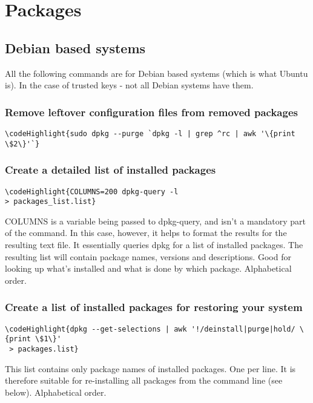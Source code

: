 \documentclass[12pt,a4paper]{article}
\begin{document}
\section{Packages}
\label{Packages}
\subsection{Debian based systems}
All the following commands are for Debian based systems (which is what Ubuntu is). In the case of trusted keys - not all Debian systems have them. 
\subsubsection{Remove leftover configuration files from removed packages}
\begin{Verbatim}[commandchars=\\\{\}]
\codeHighlight{sudo dpkg --purge `dpkg -l | grep ^rc | awk '\{print \$2\}'`}
\end{Verbatim}


\subsubsection{Create a detailed list of installed packages}
\begin{Verbatim}[commandchars=\\\{\}]
\codeHighlight{COLUMNS=200 dpkg-query -l
> packages_list.list}
\end{Verbatim}
COLUMNS is a variable being passed to dpkg-query, and isn't a mandatory part of the command.  In this case, however, it helps to format the results for the resulting text file. It essentially queries dpkg for a list of installed packages. The resulting list will contain package names, versions and descriptions. Good for looking up what’s installed and what is done by which package. Alphabetical order.

\subsubsection{Create a list of installed packages for restoring your system}
\begin{Verbatim}[commandchars=\\\{\}]
\codeHighlight{dpkg --get-selections | awk '!/deinstall|purge|hold/ \{print \$1\}'
 > packages.list}
\end{Verbatim}
This list contains only package names of installed packages. One per line. It is therefore suitable for re-installing all packages from the command line (see below). Alphabetical order.
\end{document}
